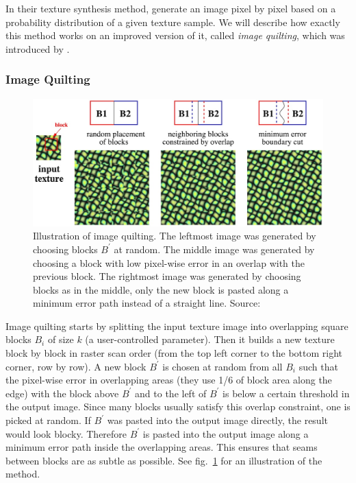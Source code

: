 In their texture synthesis method, \citet{Efros1999} generate an image pixel by pixel based on a probability distribution of a given texture sample. We will describe how exactly this method works on an improved version of it, called \textit{image quilting}, which was introduced by \citet{Efros2001}.

\subsubsection{Image Quilting}
\label{section:background-texture_synthesis-patch_based-quilting}

\begin{figure}
    \centering
    \includegraphics[width=\textwidth]{images/02-quilting_method.jpg}
    \caption{Illustration of image quilting. The leftmost image was generated by choosing blocks \(B^{\prime}\) at random. The middle image was generated by choosing a block with low pixel-wise error in an overlap with the previous block. The rightmost image was generated by choosing blocks as in the middle, only the new block is pasted along a minimum error path instead of a straight line.  Source: \citet{Efros2001}}
    \label{fig:background_quilting_method}
\end{figure}

Image quilting starts by splitting the input texture image into overlapping square blocks \(B_i\) of size \(k\) (a user-controlled parameter). Then it builds a new texture block by block in raster scan order (from the top left corner to the bottom right corner, row by row). A new block \(B^{\prime}\) is chosen at random from all \(B_i\) such that the pixel-wise error in overlapping areas (they use 1/6 of block area along the edge) with the block above \(B^{\prime}\) and to the left of \(B^{\prime}\) is below a certain threshold in the output image. Since many blocks usually satisfy this overlap constraint, one is picked at random. If \(B^{\prime}\) was pasted into the output image directly, the result would look blocky. Therefore \(B^{\prime}\) is pasted into the output image along a minimum error path inside the overlapping areas. This ensures that seams between blocks are as subtle as possible. See fig.~\ref{fig:background_quilting_method} for an illustration of the method.


